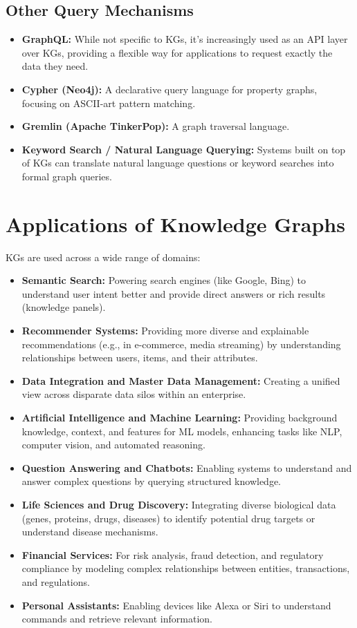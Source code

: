 \documentclass[11pt, a4paper]{article}
\begin{document}
\subsection{Other Query Mechanisms}
\label{subsec:other_query}
\begin{itemize}
    \item \textbf{GraphQL:} While not specific to KGs, it's increasingly used as an API layer over KGs, providing a flexible way for applications to request exactly the data they need.
    \item \textbf{Cypher (Neo4j):} A declarative query language for property graphs, focusing on ASCII-art pattern matching.
    \item \textbf{Gremlin (Apache TinkerPop):} A graph traversal language.
    \item \textbf{Keyword Search / Natural Language Querying:} Systems built on top of KGs can translate natural language questions or keyword searches into formal graph queries.
\end{itemize}

\section{Applications of Knowledge Graphs}
\label{sec:applications}

KGs are used across a wide range of domains:

\begin{itemize}[leftmargin=*]
    \item \textbf{Semantic Search:} Powering search engines (like Google, Bing) to understand user intent better and provide direct answers or rich results (knowledge panels).
    \item \textbf{Recommender Systems:} Providing more diverse and explainable recommendations (e.g., in e-commerce, media streaming) by understanding relationships between users, items, and their attributes.
    \item \textbf{Data Integration and Master Data Management:} Creating a unified view across disparate data silos within an enterprise.
    \item \textbf{Artificial Intelligence and Machine Learning:} Providing background knowledge, context, and features for ML models, enhancing tasks like NLP, computer vision, and automated reasoning.
    \item \textbf{Question Answering and Chatbots:} Enabling systems to understand and answer complex questions by querying structured knowledge.
    \item \textbf{Life Sciences and Drug Discovery:} Integrating diverse biological data (genes, proteins, drugs, diseases) to identify potential drug targets or understand disease mechanisms.
    \item \textbf{Financial Services:} For risk analysis, fraud detection, and regulatory compliance by modeling complex relationships between entities, transactions, and regulations.
    \item \textbf{Personal Assistants:} Enabling devices like Alexa or Siri to understand commands and retrieve relevant information.
\end{itemize}
\end{document}
